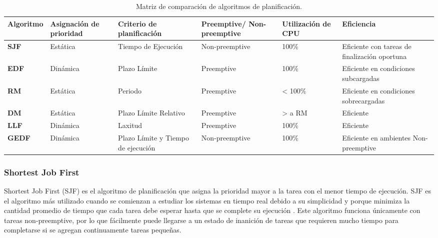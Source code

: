        \begin{table}[h!]
      \begin{center}
            \scriptsize
        \begin{tabular}{|m{1.5cm}|m{2cm}|m{2cm}|m{2cm}|m{2cm}|m{3cm}|}
         \hline
        \cellcolor{lightgray}\textbf{Algoritmo} & \cellcolor{lightgray} \textbf{Asignación de prioridad} & \cellcolor{lightgray} \textbf{Criterio de planificación} & \cellcolor{lightgray} \textbf{Preemptive/ Non-preemptive} & \cellcolor{lightgray} \textbf{Utilización de CPU} & \cellcolor{lightgray} \textbf{Eficiencia}  \\ 
         \hline
          \textbf{SJF} & Estática & Tiempo de Ejecución & Non-preemptive & 100\% & Eficiente con tareas de finalización oportuna \\
         \hline
         \textbf{EDF} & Dinámica & Plazo Límite & Preemptive & 100\% & Eficiente en condiciones subcargadas \\
         \hline 
         \textbf{RM} & Estática & Periodo & Preemptive & < 100\% & Eficiente en condiciones sobrecargadas \\
         \hline
          \textbf{DM} & Estática & Plazo Límite Relativo & Preemptive & > a RM & Eficiente \\
         \hline
          \textbf{LLF} & Dinámica & Laxitud & Preemptive & 100\% & Eficiente \\
         \hline
          \textbf{GEDF} & Dinámica & Plazo Límite y Tiempo de ejecución & Non-preemptive & 100\%& Eficiente en ambientes Non-preemptive \\
         \hline
                \end{tabular}
        \caption{Matriz de comparación de algoritmos de planificación.}
        \label{tab:table2}
      \end{center}
    \end{table}
    
    \subsubsection{Shortest Job First}
    Shortest Job First (SJF) es el algoritmo de planificación que asigna la prioridad mayor a la tarea con el menor tiempo de ejecución. SJF es el algoritmo más utilizado cuando se comienzan a estudiar los sistemas en tiempo real debido a su simplicidad y porque minimiza la cantidad promedio de tiempo que cada tarea debe esperar hasta que se complete su ejecución \cite{Tanenbaum}. Este algoritmo funciona únicamente con tareas non-preemptive, por lo que fácilmente puede llegarse a un estado de inanición de tareas que requieren mucho tiempo para completarse si se agregan continuamente tareas pequeñas.
    
